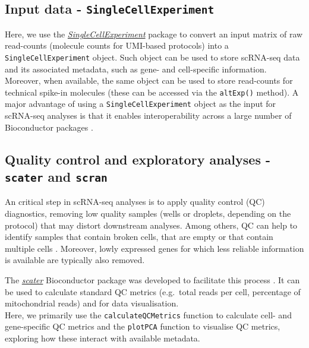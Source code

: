 \documentclass[9pt,a4paper,]{extarticle}
\begin{document}
\hypertarget{input-data---singlecellexperiment}{%
\subsection{\texorpdfstring{Input data - \texttt{SingleCellExperiment}}{Input data - SingleCellExperiment}}\label{input-data---singlecellexperiment}}

Here, we use the \emph{\href{https://bioconductor.org/packages/3.11/SingleCellExperiment}{SingleCellExperiment}} package to convert an input
matrix of raw read-counts (molecule counts for UMI-based protocols) into a
\texttt{SingleCellExperiment} object.
Such object can be used to store scRNA-seq data and its associated metadata,
such as gene- and cell-specific information.
Moreover, when available, the same object can be used to store read-counts for
technical spike-in molecules (these can be accessed via the \texttt{altExp()} method).
A major advantage of using a \texttt{SingleCellExperiment} object as the input for
scRNA-seq analyses is that it enables interoperability across a large number of
Bioconductor packages \citep{Amezquita2019}.

\hypertarget{quality-control-and-exploratory-analyses---scater-and-scran}{%
\subsection{\texorpdfstring{Quality control and exploratory analyses - \texttt{scater} and \texttt{scran}}{Quality control and exploratory analyses - scater and scran}}\label{quality-control-and-exploratory-analyses---scater-and-scran}}

An critical step in scRNA-seq analyses is to apply quality control (QC)
diagnostics, removing low quality samples (wells or droplets, depending on
the protocol) that may distort downstream analyses.
Among others, QC can help to identify samples that contain broken cells, that
are empty or that contain multiple cells \citep{Ilicic2016classification}.
Moreover, lowly expressed genes for which less reliable information is available
are typically also removed.

The \emph{\href{https://bioconductor.org/packages/3.11/scater}{scater}} Bioconductor package was developed to facilitate
this process \citep{McCarthy2017}.
It can be used to calculate standard QC metrics (e.g.~total reads per cell,
percentage of mitochondrial reads) and for data visualisation.\\
Here, we primarily use the \texttt{calculateQCMetrics} function to calculate cell-
and gene-specific QC metrics and the \texttt{plotPCA} function to visualise QC metrics,
exploring how these interact with available metadata.
\end{document}
